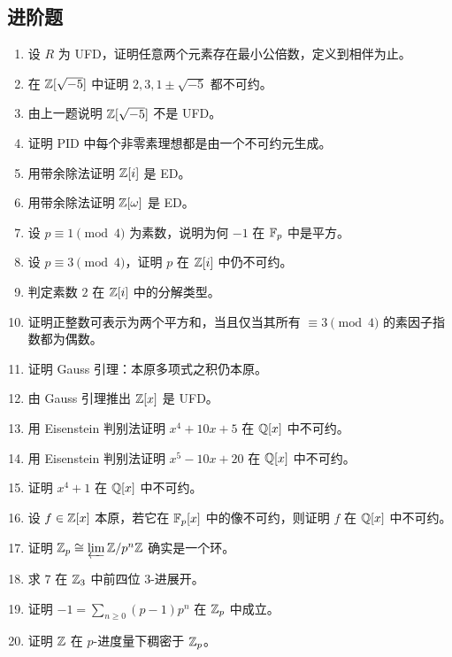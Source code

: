 \subsection*{进阶题}
\begin{enumerate}[resume, label=\textbf{\arabic*.}, leftmargin=*, itemsep=0.5em]
\item \medium 设 $R$ 为 UFD，证明任意两个元素存在最小公倍数，定义到相伴为止。
\item \medium 在 $\mathbb{Z}[\sqrt{-5}]$ 中证明 $2,3,1\pm\sqrt{-5}$ 都不可约。
\item \medium 由上一题说明 $\mathbb{Z}[\sqrt{-5}]$ 不是 UFD。
\item \medium 证明 PID 中每个非零素理想都是由一个不可约元生成。
\item \medium 用带余除法证明 $\mathbb{Z}[i]$ 是 ED。
\item \medium 用带余除法证明 $\mathbb{Z}[\omega]$ 是 ED。
\item \medium 设 $p\equiv1\pmod4$ 为素数，说明为何 $-1$ 在 $\mathbb{F}_p$ 中是平方。
\item \medium 设 $p\equiv3\pmod4$，证明 $p$ 在 $\mathbb{Z}[i]$ 中仍不可约。
\item \medium 判定素数 $2$ 在 $\mathbb{Z}[i]$ 中的分解类型。
\item \medium 证明正整数可表示为两个平方和，当且仅当其所有 $\equiv3\pmod4$ 的素因子指数都为偶数。
\item \medium 证明 Gauss 引理：本原多项式之积仍本原。
\item \medium 由 Gauss 引理推出 $\mathbb{Z}[x]$ 是 UFD。
\item \medium 用 Eisenstein 判别法证明 $x^4+10x+5$ 在 $\mathbb{Q}[x]$ 中不可约。
\item \medium 用 Eisenstein 判别法证明 $x^5-10x+20$ 在 $\mathbb{Q}[x]$ 中不可约。
\item \medium 证明 $x^4+1$ 在 $\mathbb{Q}[x]$ 中不可约。
\item \medium 设 $f\in\mathbb{Z}[x]$ 本原，若它在 $\mathbb{F}_p[x]$ 中的像不可约，则证明 $f$ 在 $\mathbb{Q}[x]$ 中不可约。
\item \medium 证明 $\mathbb{Z}_p\cong \varprojlim \mathbb{Z}/p^n\mathbb{Z}$ 确实是一个环。
\item \medium 求 $7$ 在 $\mathbb{Z}_3$ 中前四位 $3$-进展开。
\item \medium 证明 $-1=\sum_{n\ge0} (p-1)p^n$ 在 $\mathbb{Z}_p$ 中成立。
\item \medium 证明 $\mathbb{Z}$ 在 $p$-进度量下稠密于 $\mathbb{Z}_p$。
\end{enumerate}

